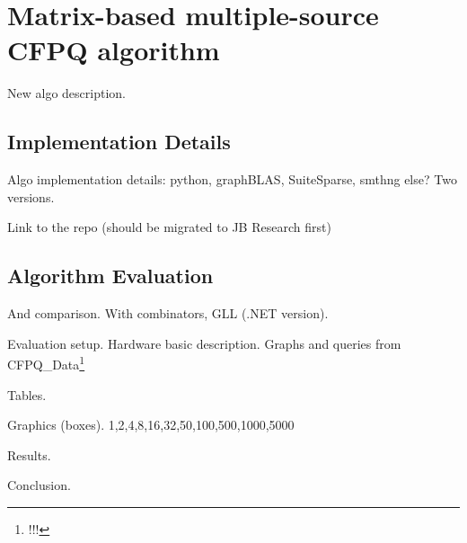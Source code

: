 \section{Matrix-based multiple-source CFPQ algorithm}

New algo description.

\subsection{Implementation Details}

Algo implementation details: python, graphBLAS, SuiteSparse, smthng else? Two versions.

Link to the repo (should be migrated to JB Research first)

\subsection{Algorithm Evaluation}

And comparison. With combinators, GLL (.NET version).

Evaluation setup.
Hardware basic description.
Graphs and queries from CFPQ\_Data\footnote{!!!}

Tables.

Graphics (boxes). 1,2,4,8,16,32,50,100,500,1000,5000

Results.

Conclusion. 